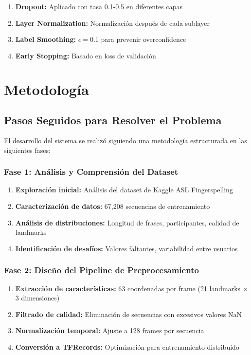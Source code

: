 \documentclass[12pt,a4paper]{article}
\begin{document}
\begin{enumerate}
    \item \textbf{Dropout:} Aplicado con tasa 0.1-0.5 en diferentes capas
    \item \textbf{Layer Normalization:} Normalización después de cada sublayer
    \item \textbf{Label Smoothing:} $\epsilon = 0.1$ para prevenir overconfidence
    \item \textbf{Early Stopping:} Basado en loss de validación
\end{enumerate}

\section{Metodología}

\subsection{Pasos Seguidos para Resolver el Problema}

El desarrollo del sistema se realizó siguiendo una metodología estructurada en las siguientes fases:

\subsubsection{Fase 1: Análisis y Comprensión del Dataset}
\begin{enumerate}
    \item \textbf{Exploración inicial:} Análisis del dataset de Kaggle ASL Fingerspelling
    \item \textbf{Caracterización de datos:} 67,208 secuencias de entrenamiento
    \item \textbf{Análisis de distribuciones:} Longitud de frases, participantes, calidad de landmarks
    \item \textbf{Identificación de desafíos:} Valores faltantes, variabilidad entre usuarios
\end{enumerate}

\subsubsection{Fase 2: Diseño del Pipeline de Preprocesamiento}
\begin{enumerate}
    \item \textbf{Extracción de características:} 63 coordenadas por frame (21 landmarks × 3 dimensiones)
    \item \textbf{Filtrado de calidad:} Eliminación de secuencias con excesivos valores NaN
    \item \textbf{Normalización temporal:} Ajuste a 128 frames por secuencia
    \item \textbf{Conversión a TFRecords:} Optimización para entrenamiento distribuido
\end{enumerate}
\end{document}
